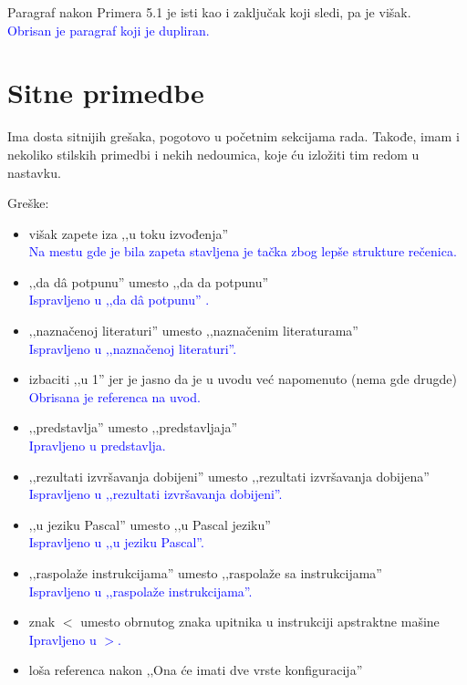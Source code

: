 \documentclass[a4paper]{report}
\newcommand{\odgovor}[1]{\textcolor{blue}{#1}}
\begin{document}
{Paragraf nakon Primera 5.1 je isti kao i zaključak koji sledi, pa je višak.} \\
\odgovor {Obrisan je paragraf koji je dupliran.}

\section{Sitne primedbe}

{Ima dosta sitnijih grešaka, pogotovo u početnim sekcijama rada. Takođe, imam i nekoliko stilskih primedbi i nekih nedoumica, koje ću izložiti tim redom u nastavku.}

Greške:
\begin{itemize}
	\item višak zapete iza ‚‚u toku izvođenja'' \\
	\odgovor{Na mestu gde je bila zapeta stavljena je tačka zbog lepše strukture rečenica.} 
	\item ‚‚da d\^{a} potpunu'' umesto ‚‚da da potpunu''\\
	\odgovor{Ispravljeno u ‚‚da d\^{a} potpunu'' .}
	\item ‚‚naznačenoj literaturi'' umesto ‚‚naznačenim literaturama''\\
	\odgovor{Ispravljeno u ‚‚naznačenoj literaturi''.}
	\item izbaciti ‚‚u 1'' jer je jasno da je u uvodu već napomenuto (nema gde drugde)\\
	\odgovor{Obrisana je referenca na uvod.}
	\item ‚‚predstavlja'' umesto ‚‚predstavljaja''\\
	\odgovor{Ipravljeno u predstavlja.}
	\item ‚‚rezultati izvršavanja dobijeni'' umesto ‚‚rezultati izvršavanja dobijena''\\
	 \odgovor{Ispravljeno u ‚‚rezultati izvršavanja dobijeni''. }
	\item ‚‚u jeziku Pascal'' umesto ‚‚u Pascal jeziku''\\
	\odgovor{Ispravljeno u ‚‚u jeziku Pascal''.}
	\item ‚‚raspolaže instrukcijama'' umesto ‚‚raspolaže sa instrukcijama''\\
	 \odgovor{Ispravljeno u ‚‚raspolaže instrukcijama''.}
	\item znak \textit{$<$} umesto obrnutog znaka upitnika u instrukciji apstraktne mašine\\
	\odgovor{Ipravljeno u \textit{$>$}.}
	\item loša referenca nakon ‚‚Ona će imati dve vrste konfiguracija''\\

\end{itemize}
\end{document}
